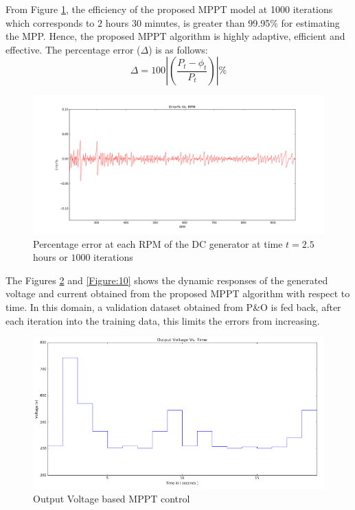 From Figure \ref{Figure:8}, the  efficiency of the proposed MPPT model at 1000 iterations which corresponds to $2$ hours $30$ minutes, is greater than 99.95\% for estimating the MPP. Hence, the proposed MPPT algorithm is highly adaptive, efficient and effective. The percentage error ($\Delta$) is as follows: 
\begin{equation} \label{eq:9}
\Delta  = 100| ( \frac{P_t - \phi_t}{P_t})|\%
\end{equation}
\begin{center}
\begin{figure}
\includegraphics[width=12cm,keepaspectratio]{7.png}
\caption{ Percentage error at each RPM of the DC generator at time $t = 2.5$ hours or $1000$ iterations}
\label{Figure:8}    
\end{figure}
\end{center}
The Figures \ref{Figure:9} and \ref{Figure:10} shows the dynamic responses of the generated voltage and current obtained from the proposed MPPT algorithm with respect to time. In this domain,  a validation dataset obtained from P\&O is fed back, after each iteration into the training data, this limits the errors from increasing.
\begin{figure}
\includegraphics[width=12cm,keepaspectratio]{8.png}
\caption {Output Voltage based MPPT control}
\label{Figure:9}    
\end{figure}
